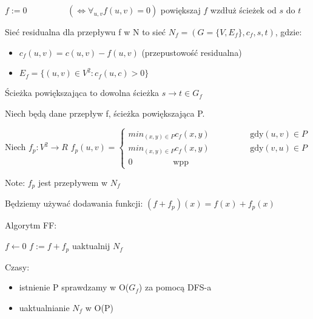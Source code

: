 \begin{algorithmic}
    \State $f:= 0  \hspace{2cm} (\iff \forall_{u,v} f(u,v) = 0)$
    \State powiększaj $f$ wzdłuż ścieżek od $s$ do $t$
    \EndFor
\end{algorithmic}

\begin{defi}
    Sieć residualna dla przepływu f w N to sieć $N_f = (G = \{V, E_f\}, c_f, s, t)$, gdzie:
    \begin{itemize}
        \item $c_f(u, v) = c(u,v) - f(u,v)$ (przepustowość residualna)
        \item $E_f = \{ (u,v) \in V^2 : c_f(u,c) > 0 \}$
    \end{itemize}
\end{defi}

\begin{defi}
    Ścieżka powiększająca to dowolna ścieżka $s \rightarrow t \in G_f$
\end{defi}

Niech będą dane przepływ f, ścieżka powiększająca P.

Niech $f_p: V^2 \rightarrow R$ \newline
$f_p(u,v) =
\begin{cases}
    min_{(x,y) \in P} c_f(x,y) \hspace{2cm} \text{gdy} (u,v) \in P \\
    min_{(x,y) \in P} c_f(x,y) \hspace{2cm} \text{gdy} (v,u) \in P \\
    0 \hspace{2cm} \text{wpp}
\end{cases}$


Note: $f_p$ jest przepływem w $N_f$

Będziemy używać dodawania funkcji: $(f + f_p)(x) = f(x) + f_p(x)$

Algorytm FF:

\begin{algorithmic}
    \State $f \gets 0$
        \State $f := f + f_p$
        \State uaktualnij $N_f$
        \EndWhile
\end{algorithmic}

Czasy:
\begin{itemize}[noitemsep, topsep=0pt]
    \item istnienie P sprawdzamy w O($G_f$) za pomocą DFS-a
    \item uaktualnianie $N_f$ w O(P)
\end{itemize}

